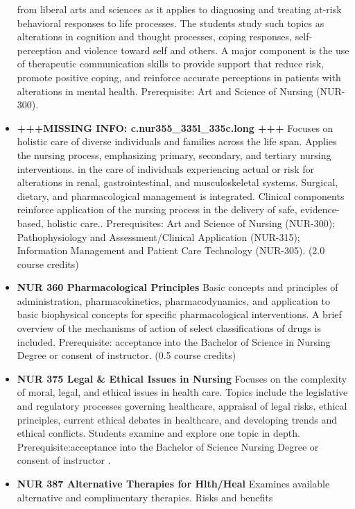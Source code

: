 \documentclass[
  letterpaper,
]{scrbook}
\begin{document}
\begin{itemize}
  from liberal arts and sciences as it applies to diagnosing and
  treating at-risk behavioral responses to life processes. The students
  study such topics as alterations in cognition and thought processes,
  coping responses, self-perception and violence toward self and others.
  A major component is the use of therapeutic communication skills to
  provide support that reduce risk, promote positive coping, and
  reinforce accurate perceptions in patients with alterations in mental
  health. Prerequisite: Art and Science of Nursing (NUR-300).\\
\item
  \textbf{+++MISSING INFO: c.nur355\_335l\_335c.long +++} Focuses on
  holistic care of diverse individuals and families across the life
  span. Applies the nursing process, emphasizing primary, secondary, and
  tertiary nursing interventions. in the care of individuals
  experiencing actual or risk for alterations in renal,
  gastrointestinal, and musculoskeletal systems. Surgical, dietary, and
  pharmacological management is integrated. Clinical components
  reinforce application of the nursing process in the delivery of safe,
  evidence-based, holistic care.. Prerequisites: Art and Science of
  Nursing (NUR-300); Pathophysiology and Assessment/Clinical Application
  (NUR-315); Information Management and Patient Care Technology
  (NUR-305). (2.0 course credits)
\item
  \textbf{NUR 360 Pharmacological Principles} Basic concepts and
  principles of administration, pharmacokinetics, pharmacodynamics, and
  application to basic biophysical concepts for specific pharmacological
  interventions. A brief overview of the mechanisms of action of select
  classifications of drugs is included. Prerequisite: acceptance into
  the Bachelor of Science in Nursing Degree or consent of instructor.
  (0.5 course credits)\\
\item
  \textbf{NUR 375 Legal \& Ethical Issues in Nursing} Focuses on the
  complexity of moral, legal, and ethical issues in health care. Topics
  include the legislative and regulatory processes governing healthcare,
  appraisal of legal risks, ethical principles, current ethical debates
  in healthcare, and developing trends and ethical conflicts. Students
  examine and explore one topic in depth. Prerequisite:acceptance into
  the Bachelor of Science Nursing Degree or consent of instructor .
\item
  \textbf{NUR 387 Alternative Therapies for Hlth/Heal} Examines
  available alternative and complimentary therapies. Risks and benefits

\end{itemize}
\end{document}

